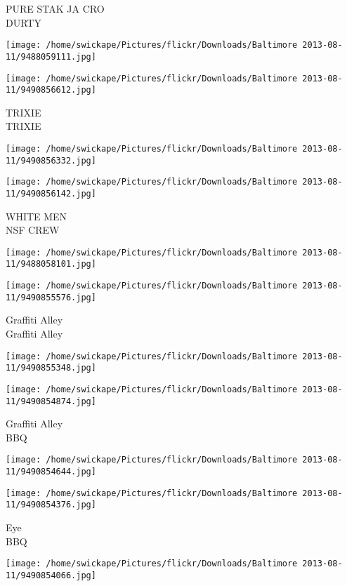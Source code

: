 \documentclass[10pt,letterpaper]{article}
\begin{document}
PURE STAK JA CRO\\
DURTY
\pagebreak

\texttt{[image: /home/swickape/Pictures/flickr/Downloads/Baltimore 2013-08-11/9488059111.jpg]}

\vspace{0.25in}
\texttt{[image: /home/swickape/Pictures/flickr/Downloads/Baltimore 2013-08-11/9490856612.jpg]}

TRIXIE\\
TRIXIE
\pagebreak

\texttt{[image: /home/swickape/Pictures/flickr/Downloads/Baltimore 2013-08-11/9490856332.jpg]}

\vspace{0.25in}
\texttt{[image: /home/swickape/Pictures/flickr/Downloads/Baltimore 2013-08-11/9490856142.jpg]}

WHITE MEN\\
NSF CREW
\pagebreak

\texttt{[image: /home/swickape/Pictures/flickr/Downloads/Baltimore 2013-08-11/9488058101.jpg]}

\vspace{0.25in}
\texttt{[image: /home/swickape/Pictures/flickr/Downloads/Baltimore 2013-08-11/9490855576.jpg]}

Graffiti Alley\\
Graffiti Alley
\pagebreak

\texttt{[image: /home/swickape/Pictures/flickr/Downloads/Baltimore 2013-08-11/9490855348.jpg]}

\vspace{0.25in}
\texttt{[image: /home/swickape/Pictures/flickr/Downloads/Baltimore 2013-08-11/9490854874.jpg]}

Graffiti Alley\\
BBQ
\pagebreak

\texttt{[image: /home/swickape/Pictures/flickr/Downloads/Baltimore 2013-08-11/9490854644.jpg]}

\vspace{0.25in}
\texttt{[image: /home/swickape/Pictures/flickr/Downloads/Baltimore 2013-08-11/9490854376.jpg]}

Eye\\
BBQ
\pagebreak

\texttt{[image: /home/swickape/Pictures/flickr/Downloads/Baltimore 2013-08-11/9490854066.jpg]}
\end{document}

